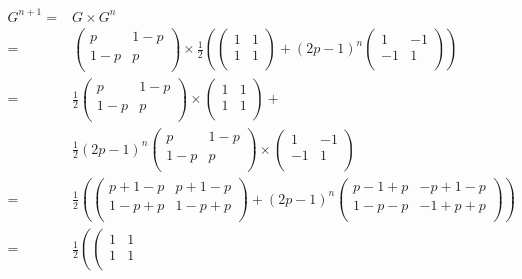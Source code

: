 \documentclass[10pt,a4paper,twoside]{article}
\begin{document}
\begin{itemize}
\begin{align*}
G^{n+1} =& G \times G^{n}\\
=&  \left(\begin{array}{cc}
p & 1-p \\
1-p & p \\
\end{array}\right) \times \frac{1}{2} \left(\left(\begin{array}{cc}
1 & 1 \\
1 & 1 \\
\end{array}\right) + (2p-1)^{n}  \left(\begin{array}{cc}
1 & -1 \\
-1 & 1 \\
\end{array}\right)\right)\\
=& \frac{1}{2}  \left(\begin{array}{cc}
p & 1-p \\
1-p & p \\
\end{array}\right) \times  \left(\begin{array}{cc}
1 & 1 \\
1 & 1 \\
\end{array}\right) + \\
&\frac{1}{2}(2p-1)^{n}  \left(\begin{array}{cc}
p & 1-p \\
1-p & p \\
\end{array}\right) \times  \left(\begin{array}{cc}
1 & -1 \\
-1 & 1 \\
\end{array}\right)\\
=&\frac{1}{2} \left(\left(\begin{array}{cc}
p+1-p & p+1-p \\
1-p+p & 1-p+p \\
\end{array}\right) + (2p-1)^{n}  \left(\begin{array}{cc}
p-1+p & -p+1-p \\
1-p-p & -1+p+p \\
\end{array}\right)\right)\\
=& \frac{1}{2} \left(  \left(\begin{array}{cc}
1 & 1 \\
1 & 1 \\

\end{array}
\end{align*}
\end{itemize}
\end{document}
